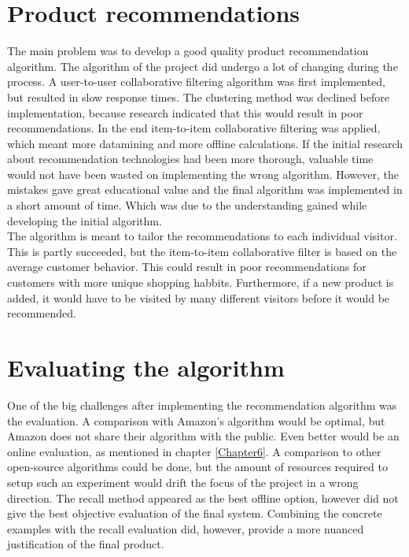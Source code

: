 \section{Product recommendations}
The main problem was to develop a good quality product recommendation algorithm. The algorithm of the project did undergo a lot of changing during the process. A user-to-user collaborative filtering algorithm was first implemented, but resulted in slow response times. The clustering method was declined before implementation, because research indicated that this would result in poor recommendations. \cite{AmazonRecommendations} In the end item-to-item collaborative filtering was applied, which meant more datamining and more offline calculations. If the initial research about recommendation technologies had been more thorough, valuable time would not have been wasted on implementing the wrong algorithm. However, the mistakes gave great educational value and the final algorithm was implemented in a short amount of time. Which was due to the understanding gained while developing the initial algorithm.\\
The algorithm is meant to tailor the recommendations to each individual visitor. This is partly succeeded, but the item-to-item collaborative filter is based on the average customer behavior. This could result in poor recommendations for customers with more unique shopping habbits. Furthermore, if a new product is added, it would have to be visited by many different visitors before it would be recommended.

\section{Evaluating the algorithm}
One of the big challenges after implementing the recommendation algorithm was the evaluation. A comparison with Amazon's algorithm would be optimal, but Amazon does not share their algorithm with the public. Even better would be an online evaluation, as mentioned in chapter \ref{Chapter6}. A comparison to other open-source algorithms could be done, but the amount of resources required to setup such an experiment would drift the focus of the project in a wrong direction. The recall method appeared as the best offline option, however did not give the best objective evaluation of the final system. Combining the concrete examples with the recall evaluation did, however, provide a more nuanced justification of the final product.